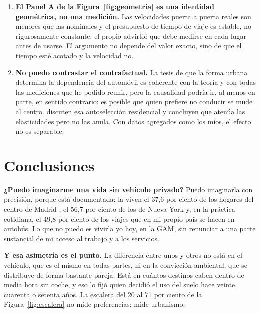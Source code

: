 \documentclass[11pt,letterpaper]{article}
\begin{document}
\begin{enumerate}
{    del mundo no es utilizable.} Circula ampliamente, pero procede del índice
    de Numbeo, que se construye con respuestas voluntarias de usuarios y no con
    mediciones de sondas de tráfico; el índice de TomTom, que sí las usa, no
    cubre San José por falta de datos granulares. Lo que sí resiste el
    escrutinio son las estimaciones de coste del Programa Estado de la Nación y
    de la Universidad Nacional, que proceden de encuestas de empleo y de
    matrices de origen y destino.
  \item \textbf{El Panel A de la Figura~\ref{fig:geometria} es una identidad
    geométrica, no una medición.} Las velocidades puerta a puerta reales son
    menores que las nominales y el presupuesto de tiempo de viaje es estable,
    no rigurosamente constante: el propio \textcite{zahavi1974} advirtió que
    debe medirse en cada lugar antes de usarse. El argumento no depende del
    valor exacto, sino de que el tiempo esté acotado y la velocidad no.
  \item \textbf{No puedo contrastar el contrafactual.} La tesis de que la forma
    urbana determina la dependencia del automóvil es coherente con la teoría y
    con todas las mediciones que he podido reunir, pero la causalidad podría
    ir, al menos en parte, en sentido contrario: es posible que quien prefiere
    no conducir se mude al centro. \textcite{ewing2010} discuten esa
    autoselección residencial y concluyen que atenúa las elasticidades pero no
    las anula. Con datos agregados como los míos, el efecto no es separable.
\end{enumerate}

\section*{Conclusiones}

\textbf{¿Puedo imaginarme una vida sin vehículo privado?} Puedo imaginarla con
precisión, porque está documentada: la viven el 37,6 por ciento de los hogares
del centro de Madrid \parencite{crtm2019}, el 56,7 por ciento de los de Nueva
York \parencite{acs2024} y, en la práctica
cotidiana, el 49,8 por ciento de los viajes que en mi propio país se hacen en
autobús. Lo que no puedo es vivirla yo hoy, en la GAM, sin renunciar a una
parte sustancial de mi acceso al trabajo y a los servicios.

\textbf{Y esa asimetría es el punto.} La diferencia entre unos y otros no está
en el vehículo, que es el mismo en todas partes, ni en la convicción ambiental,
que se distribuye de forma bastante pareja. Está en cuántos destinos caben
dentro de media hora sin coche, y eso lo fijó quien decidió el uso del suelo
hace veinte, cuarenta o setenta años. La escalera del 20 al 71 por ciento de la
Figura~\ref{fig:escalera} no mide preferencias: mide urbanismo.
\end{document}
